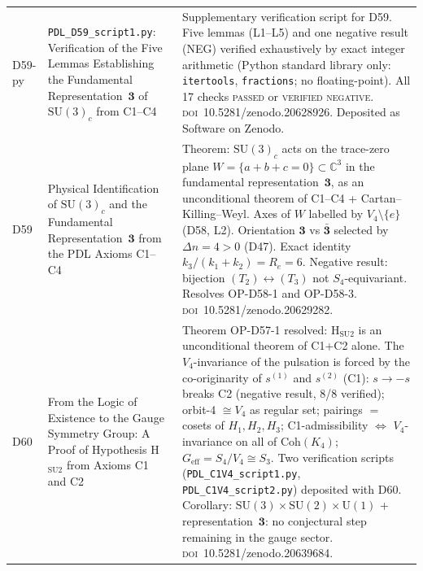 \documentclass[11pt,a4paper]{article}
\theoremstyle{plain}
\theoremstyle{definition}
\theoremstyle{remark}
\begin{document}
\begin{longtable}{L{1.3cm}L{3.8cm}L{8.0cm}}
D59-py & \texttt{PDL\_D59\_script1.py}: Verification of the Five Lemmas Establishing the Fundamental Representation~$\mathbf{3}$ of $\mathrm{SU}(3)_c$ from C1--C4~\cite{D59py} & Supplementary verification script for D59. Five lemmas (L1--L5) and one negative result (NEG) verified exhaustively by exact integer arithmetic (Python standard library only: \texttt{itertools}, \texttt{fractions}; no floating-point). All 17 checks \textsc{passed} or \textsc{verified negative}. \textsc{doi}~10.5281/zenodo.20628926. Deposited as Software on Zenodo.\\[0.4em]
D59 & Physical Identification of $\mathrm{SU}(3)_c$ and the Fundamental Representation~$\mathbf{3}$ from the PDL Axioms C1--C4~\cite{D59} & \textcolor{proofblue}{Theorem}: $\mathrm{SU}(3)_c$ acts on the trace-zero plane $W = \{a+b+c=0\}\subset\mathbb{C}^3$ in the fundamental representation~$\mathbf{3}$, as an unconditional theorem of C1--C4 + Cartan--Killing--Weyl. Axes of $W$ labelled by $V_4\setminus\{e\}$ (D58, L2). Orientation $\mathbf{3}$ vs $\bar{\mathbf{3}}$ selected by $\Delta n = 4 > 0$ (D47). Exact identity $k_3/(k_1+k_2) = R_e = 6$. Negative result: bijection $(T_2)\leftrightarrow(T_3)$ not $S_4$-equivariant. Resolves OP-D58-1 and OP-D58-3. \textsc{doi}~10.5281/zenodo.20629282.\\[0.4em]
D60 & From the Logic of Existence to the Gauge Symmetry Group: A Proof of Hypothesis H$_{\mathrm{SU2}}$ from Axioms C1 and C2~\cite{D60} & \textcolor{proofblue}{Theorem} OP-D57-1 resolved: H$_{\mathrm{SU2}}$ is an unconditional theorem of C1+C2 alone. The $V_4$-invariance of the pulsation is forced by the co-originarity of $s^{(1)}$ and $s^{(2)}$ (C1): $s \to -s$ breaks C2 (negative result, 8/8 verified); orbit-4 $\cong V_4$ as regular set; pairings $= $ cosets of $H_1,H_2,H_3$; C1-admissibility $\Leftrightarrow$ $V_4$-invariance on all of $\mathrm{Coh}(K_4)$; $G_{\mathrm{eff}} = S_4/V_4 \cong S_3$. Two verification scripts (\texttt{PDL\_C1V4\_script1.py}, \texttt{PDL\_C1V4\_script2.py}) deposited with D60. Corollary: $\mathrm{SU}(3)\times\mathrm{SU}(2)\times\mathrm{U}(1)$ + representation~$\mathbf{3}$: no conjectural step remaining in the gauge sector. \textsc{doi}~10.5281/zenodo.20639684.\\[0.4em]

\end{longtable}
\end{document}
